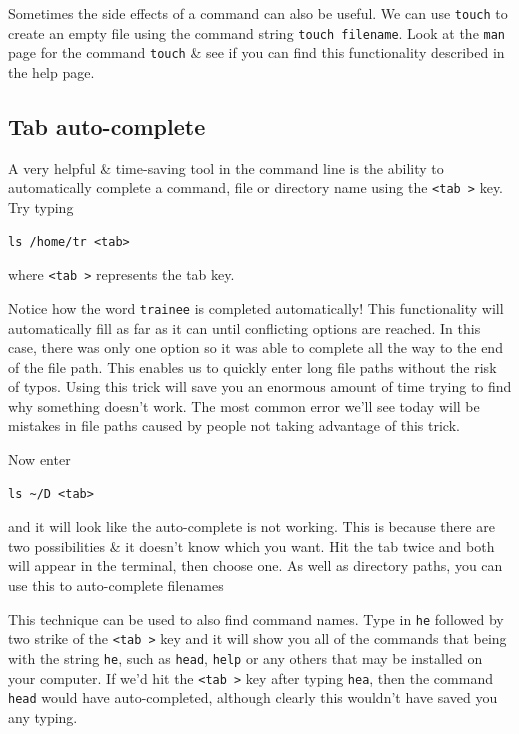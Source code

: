 \documentclass[a4paper,12pt,twoside]{memoir}
\begin{document}
\begin{bonus}
Sometimes the side effects of a command can also be useful. 
We can use \texttt{touch} to create an empty file using the command string \texttt{touch filename}.
Look at the \texttt{man} page for the command \texttt{touch} \& see if you can find this functionality described in the help page. \\
\end{bonus}

\subsection{Tab auto-complete}
\begin{steps}
A very helpful \& time-saving tool in the command line is the ability to automatically complete a command, file or directory name using the \texttt{\textless tab \textgreater} key.
Try typing 
\begin{lstlisting}
ls /home/tr <tab>
\end{lstlisting}
where \texttt{\textless tab \textgreater} represents the tab key.
\end{steps}
\begin{information}
Notice how the word \texttt{trainee} is completed automatically!
This functionality will automatically fill as far as it can until conflicting options are reached.
In this case, there was only one option so it was able to complete all the way to the end of the file path. 
This enables us to quickly enter long file paths without the risk of typos. 
Using this trick will save you an enormous amount of time trying to find why something doesn't work.
The most common error we'll see today will be mistakes in file paths caused by people not taking advantage of this trick.\\
\end{information}

\begin{steps}
Now enter
\begin{lstlisting}
ls ~/D <tab>
\end{lstlisting}
and it will look like the auto-complete is not working.
This is because there are two possibilities \& it doesn't know which you want.
Hit the tab twice and both will appear in the terminal, then choose one.
As well as directory paths, you can use this to auto-complete filenames
\end{steps}

\begin{advanced}
This technique can be used to also find command names.
Type in \texttt{he} followed by two strike of the \texttt{\textless tab \textgreater} key and it will show you all of the commands that being with the string \texttt{he}, such as \texttt{head}, \texttt{help} or any others that may be installed on your computer.
If we'd hit the \texttt{\textless tab \textgreater} key after typing \texttt{hea}, then the command \texttt{head} would have auto-completed, although clearly this wouldn't have saved you any typing.
\end{advanced}
\end{document}
